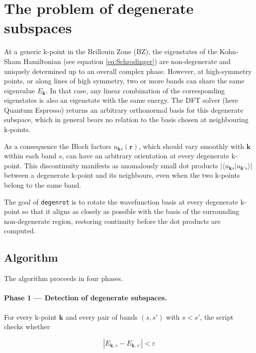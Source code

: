 \documentclass[a4paper,12pt]{report}
\begin{document}
\section{The problem of degenerate subspaces}

At a generic k-point in the Brillouin Zone (BZ), the eigenstates of the
Kohn-Sham Hamiltonian (see equation \ref{eq:Schrodinger}) are non-degenerate
and uniquely determined up to an overall complex phase.
However, at high-symmetry points, or along lines of high symmetry, two or more
bands can share the same eigenvalue $E_{\pmb{k}}$.
In that case, any linear combination of the corresponding eigenstates is also
an eigenstate with the same energy.
The DFT solver (here {\sc Quantum Espresso}) returns an arbitrary orthonormal
basis for this degenerate subspace, which in general bears no relation to the
basis chosen at neighbouring k-points.

As a consequence the Bloch factors $u_{\pmb{k}s}(\pmb{r})$, which should vary
smoothly with $\pmb{k}$ within each band $s$, can have an arbitrary
orientation at every degenerate k-point.
This discontinuity manifests as anomalously small dot products
$|\langle u_{\pmb{k}s} | u_{\pmb{k}'s}\rangle|$ between a degenerate k-point
and its neighbours, even when the two k-points belong to the same band.

The goal of \texttt{degenrot} is to rotate the wavefunction basis at every
degenerate k-point so that it aligns as closely as possible with the basis of
the surrounding non-degenerate region, restoring continuity before the dot
products are computed.


\subsection*{Algorithm}

The algorithm proceeds in four phases.

\paragraph{Phase 1 --- Detection of degenerate subspaces.}

For every k-point $\pmb{k}$ and every pair of bands $(s, s')$ with $s < s'$,
the script checks whether

\begin{equation}
  |E_{\pmb{k},s} - E_{\pmb{k},s'}| < \varepsilon
  \label{eq:degen_threshold}
\end{equation}
\end{document}
